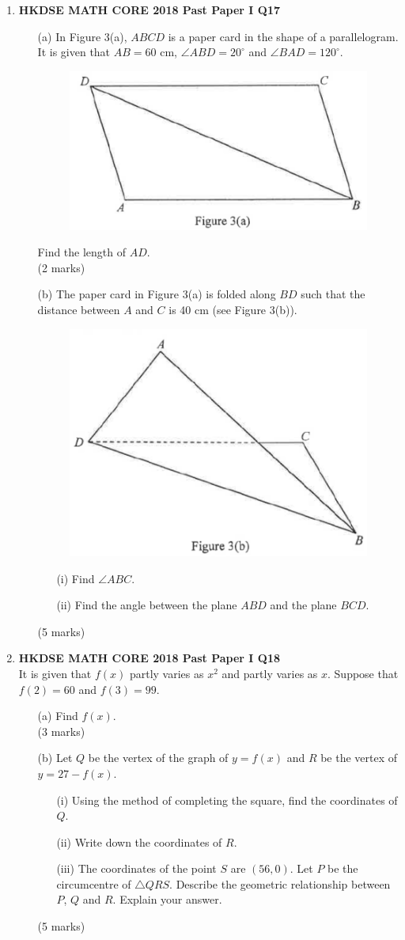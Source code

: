 \documentclass[12pt]{article}
\begin{document}
\begin{enumerate}
	\item \textbf{HKDSE MATH CORE 2018 Past Paper I Q17}
	\begin{enumerate}
		\item[(a)] In Figure 3(a), $ABCD$ is a paper card in the shape of a parallelogram. It is given that $AB = 60$ cm, $\angle ABD = 20^\circ$ and $\angle BAD = 120^\circ$.
		\begin{figure}[H]
			\centering
			\includegraphics[width = .3\linewidth]{2018Figure1.3a}
		\end{figure}
		Find the length of $AD$. \\(2 marks)
		\item[(b)] The paper card in Figure 3(a) is folded along $BD$ such that the distance between $A$ and $C$ is 40 cm (see Figure 3(b)).
		\begin{figure}[H]
			\centering
			\includegraphics[width = .3\linewidth]{2018Figure1.3b}
		\end{figure}
		\begin{enumerate}
			\item[(i)] Find $\angle ABC$.
			\item[(ii)] Find the angle between the plane $ABD$ and the plane $BCD$.
		\end{enumerate}
		(5 marks)
	\end{enumerate}

	\item \textbf{HKDSE MATH CORE 2018 Past Paper I Q18}\\
	It is given that $f(x)$ partly varies as $x^2$ and partly varies as $x$. Suppose that $f(2) = 60$ and $f(3) = 99$.
	\begin{enumerate}
		\item[(a)] Find $f(x)$. \\(3 marks)
		\item[(b)] Let $Q$ be the vertex of the graph of $y = f(x)$ and $R$ be the vertex of $y = 27 - f(x)$.
		\begin{enumerate}
			\item[(i)] Using the method of completing the square, find the coordinates of $Q$.
			\item[(ii)] Write down the coordinates of $R$.
			\item[(iii)] The coordinates of the point $S$ are $(56, 0)$. Let $P$ be the circumcentre of $\triangle QRS$. Describe the geometric relationship between $P$, $Q$ and $R$. Explain your answer.
		\end{enumerate}
		(5 marks)
	\end{enumerate}


\end{enumerate}
\end{document}
